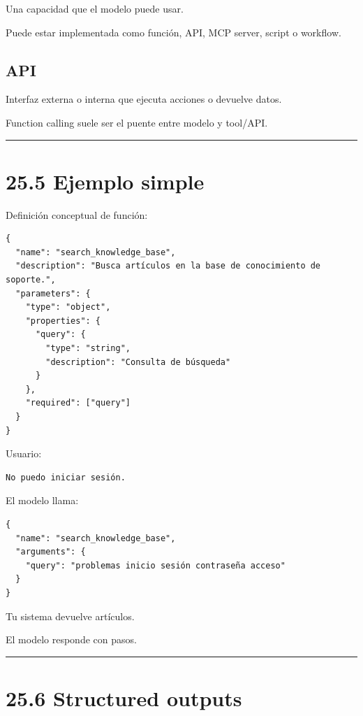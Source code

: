 Una capacidad que el modelo puede usar.

Puede estar implementada como función, API, MCP server, script o
workflow.

\subsection{API}\label{api}

Interfaz externa o interna que ejecuta acciones o devuelve datos.

Function calling suele ser el puente entre modelo y tool/API.

\begin{center}\rule{0.5\linewidth}{0.5pt}\end{center}

\section{25.5 Ejemplo simple}\label{ejemplo-simple}

Definición conceptual de función:

\begin{lstlisting}
{
  "name": "search_knowledge_base",
  "description": "Busca artículos en la base de conocimiento de soporte.",
  "parameters": {
    "type": "object",
    "properties": {
      "query": {
        "type": "string",
        "description": "Consulta de búsqueda"
      }
    },
    "required": ["query"]
  }
}
\end{lstlisting}

Usuario:

\begin{lstlisting}
No puedo iniciar sesión.
\end{lstlisting}

El modelo llama:

\begin{lstlisting}
{
  "name": "search_knowledge_base",
  "arguments": {
    "query": "problemas inicio sesión contraseña acceso"
  }
}
\end{lstlisting}

Tu sistema devuelve artículos.

El modelo responde con pasos.

\begin{center}\rule{0.5\linewidth}{0.5pt}\end{center}

\section{25.6 Structured outputs}\label{structured-outputs-1}

